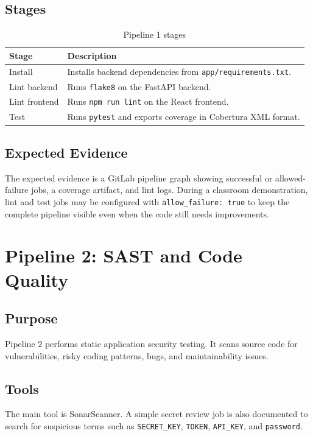 \documentclass[12pt,a4paper]{report}
\begin{document}
\subsection{Stages}

\begin{table}[H]
\centering
\caption{Pipeline 1 stages}
\begin{tabular}{p{3cm}p{10cm}}
\toprule
\textbf{Stage} & \textbf{Description} \\
\midrule
Install & Installs backend dependencies from \texttt{app/requirements.txt}. \\
Lint backend & Runs \texttt{flake8} on the FastAPI backend. \\
Lint frontend & Runs \texttt{npm run lint} on the React frontend. \\
Test & Runs \texttt{pytest} and exports coverage in Cobertura XML format. \\
\bottomrule
\end{tabular}
\end{table}

\subsection{Expected Evidence}

The expected evidence is a GitLab pipeline graph showing successful or allowed-failure jobs, a coverage artifact, and lint logs. During a classroom demonstration, lint and test jobs may be configured with \texttt{allow\_failure: true} to keep the complete pipeline visible even when the code still needs improvements.

\section{Pipeline 2: SAST and Code Quality}

\subsection{Purpose}

Pipeline 2 performs static application security testing. It scans source code for vulnerabilities, risky coding patterns, bugs, and maintainability issues.

\subsection{Tools}

The main tool is SonarScanner. A simple secret review job is also documented to search for suspicious terms such as \texttt{SECRET\_KEY}, \texttt{TOKEN}, \texttt{API\_KEY}, and \texttt{password}.
\end{document}
